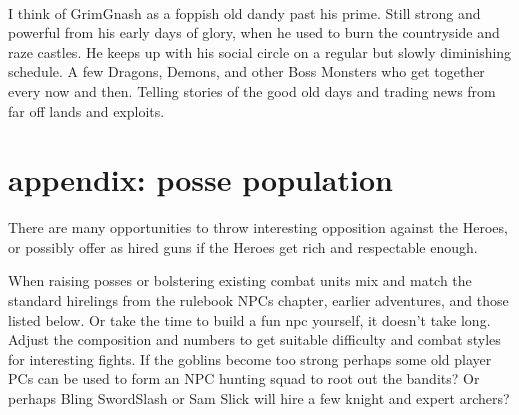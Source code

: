 \


\begin{readoutloud}
I think of GrimGnash as a foppish old dandy past his prime. Still strong and powerful from his early days of glory, when he used to burn the countryside and raze castles. He keeps up with his social circle on a regular but slowly diminishing schedule. A few Dragons, Demons, and other Boss Monsters who get together every now and then. Telling stories of the good old days and trading news from far off lands and exploits. 
\end{readoutloud}


































\clearpage
\raggedbottom
\section*{appendix: posse population}
\label{appendixpossepopulation}

There are many opportunities to throw interesting opposition against the Heroes, or possibly offer as hired guns if the Heroes get rich and respectable enough.

When raising posses or bolstering existing combat units mix and match the standard hirelings from the rulebook NPCs chapter, earlier adventures, and those listed below. Or take the time to build a fun npc yourself, it doesn't take long. Adjust the composition and numbers to get suitable difficulty and combat styles for interesting fights.
If the goblins become too strong perhaps some old player PCs can be used to form an NPC hunting squad to root out the bandits? Or perhaps Bling SwordSlash or Sam Slick will hire a few knight and expert archers?


